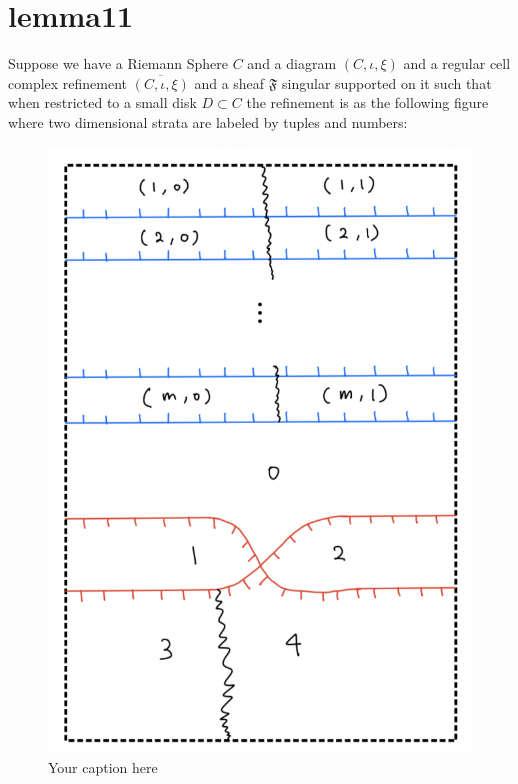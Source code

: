 \section{lemma11}
\begin{lemma}
\end{lemma}

Suppose we have a Riemann Sphere $C$ and a diagram $(C,\iota,\xi)$ and a regular cell complex refinement $\overline{(C,\iota,\xi)}$ and a sheaf $\mathfrak{F}$ singular supported on it such that when restricted to a small disk $D\subset C$ the refinement is as the following figure where two dimensional strata are labeled by tuples and numbers:

\begin{figure}[H] %
    \centering
    \includegraphics[scale=0.95]{diagrams/lemma11/1.png} %
    \caption{Your caption here}
    \label{fig:your-label}
\end{figure}

